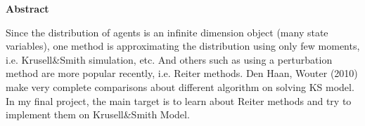 \vspace{2cm}
\begin{center}
\Large{\bf{Abstract}}
\end{center}
\indent Since the distribution of agents is an infinite dimension object (many state variables), one method is approximating the distribution using only few moments, i.e. Krusell\&Smith simulation, etc. And others such as using a perturbation method are more popular recently, i.e. Reiter methods. Den Haan, Wouter (2010)\cite{den2010comparison} make very complete comparisons about different algorithm on solving KS model. In my final project, the main target is to learn about Reiter methods and try to implement them on Krusell\&Smith Model.
